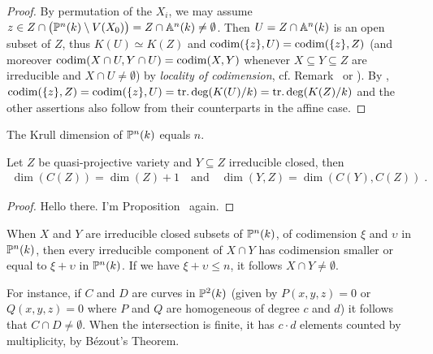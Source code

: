 \documentclass[a4paper,parskip=half,numbers=enddot, DIV=12, headheight=30pt]{scrreprt}
\begin{document}
\begin{proof}
    By permutation of the $X_i$, we may assume $z\in Z\cap \big(\mathbb{P}^n(k)\setminus V(X_0)\big) = Z\cap \mathbb{A}^n(k)\neq \emptyset$. Then $U=Z\cap \mathbb{A}^n(k)$ is an open subset of $Z$, thus $K(U)\simeq K(Z)$ and $\operatorname{codim}(\{z\},U) = \operatorname{codim}(\{z\},Z)$ (and moreover $\operatorname{codim}(X\cap U, Y\cap U) = \operatorname{codim}(X,Y)$ whenever $X\subseteq Y\subseteq Z$ are irreducible and $X\cap U\neq \emptyset$) by \emph{locality of codimension}, cf. Remark~ or \cite[Remark~2.1.3]{alg1}). By \cite[Theorem~6]{alg1}, $\operatorname{codim} (\{z\},Z) = \operatorname{codim}(\{z\},U) = \operatorname{tr.deg} (K(U)/k) = \operatorname{tr.deg} (K(Z)/k)$ and the other assertions also follow from their counterparts in the affine case.
\end{proof}
\begin{cor}
    The Krull dimension of $\mathbb{P}^n(k)$ equals $n$.
\end{cor}
\begin{prop}
    Let $Z$ be quasi-projective variety and $Y\subseteq Z$ irreducible closed, then 
    \begin{align*}
        \dim(C(Z)) = \dim(Z) +1\quad\text{and}\quad
        \dim(Y,Z) = \dim(C(Y), C(Z))\;.
    \end{align*}
\end{prop}
\begin{proof}
	Hello there. I'm Proposition~ again.
\end{proof}
\begin{thm}
    When $X$ and $Y$ are irreducible closed subsets of $\mathbb{P}^n(k)$, of codimension $\xi$ and $\upsilon$ in $\mathbb{P}^n(k)$, then every irreducible component of $X\cap Y$ has codimension smaller or equal to $\xi +\upsilon$ in $\mathbb{P}^n(k)$. If we have $\xi+\upsilon \leq n$, it follows $X\cap Y \neq \emptyset$.
\end{thm}
\begin{rem*}
    For instance, if $C$ and $D$ are curves in $\mathbb{P}^2(k)$ (given by $P(x,y,z) = 0$ or $Q(x,y,z)= 0$ where $P$ and $Q$ are homogeneous of degree $c$ and $d$) it follows that $C\cap D \neq \emptyset$. When the intersection is finite, it has $c\cdot d$ elements counted by multiplicity, by B\'ezout's Theorem.
\end{rem*}
\end{document}
